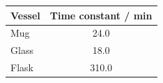 \begin{tabular}{lS[table-format=3.1]}
    \toprule
    Vessel & {Time constant / \unit{\minute}} \\
    \midrule
    Mug    & 24.0 \\
    Glass  & 18.0 \\
    Flask  & 310.0 \\
    \bottomrule
\end{tabular}
